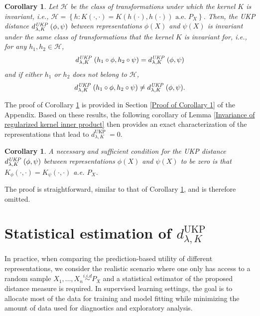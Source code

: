\documentclass[11pt]{article}
\newcommand{\repone}{\phi}
\newcommand{\reptwo}{\psi}
\newcommand{\metricstname}{UKP }
\theoremstyle{plain}
\newcounter{corollarynno}
\newtheorem{corollary}[corollarynno]{Corollary}
\begin{document}
\begin{corollary}
\label{corollary 1}
Let $\mathcal{H}$ be the class of transformations under which the kernel $K$ is invariant, i.e., $\mathcal{H} = \left\{h : K(\cdot,\cdot) = K(h(\cdot),h(\cdot))\textrm{ a.e. } P_{X}\right\}$. Then, the \emph{\metricstname} distance $d_{\lambda,K}^{\emph{\metricstname}}(\repone,\reptwo)$ between representations $\repone(X)$ and $\reptwo(X)$ is invariant under the same class of transformations that the kernel $K$ is invariant for, i.e., for any $h_{1},h_{2} \in \mathcal{H}$, 
\[
d_{\lambda,K}^{\emph{\metricstname}}(h_{1} \circ \repone,h_{2} \circ \reptwo) = d_{\lambda,K}^{\emph{\metricstname}}(\repone,\reptwo)
\]
and if either $h_{1}$ or $h_{2}$ does not belong to $\mathcal{H}$, \[
d_{\lambda,K}^{\emph{\metricstname}}(h_{1} \circ \repone,h_{2} \circ \reptwo) \neq d_{\lambda,K}^{\emph{\metricstname}}(\repone,\reptwo).
\]
\end{corollary}

The proof of Corollary \ref{corollary 1} is provided in Section  \ref{Proof of Corollary 1} of the Appendix. Based on these results, the following corollary of Lemma \ref{Invariance of regularized kernel inner product} then provides an exact characterization of the representations that lead to $d_{\lambda,K}^{\text{\metricstname}}=0$.

\begin{corollary}\label{corollary 2}
    A necessary and sufficient condition for the \emph{\metricstname} distance $d_{\lambda,K}^{\emph{\metricstname}}(\repone,\reptwo)$ between representations $\repone(X)$ and $\reptwo(X)$ to be zero is that $K_{\repone}(\cdot,\cdot) = K_{\reptwo}(\cdot,\cdot)$ a.e. $P_{X}$.
\end{corollary}

The proof is straightforward, similar to that of Corollary \ref{corollary 1}, and is therefore omitted.

\section{Statistical estimation of $d_{\lambda,K}^{\text{\metricstname}}$} \label{statistical estimation of UKP}

In practice, when comparing the prediction-based utility of different representations, we consider the realistic scenario where one only has access to a random sample $X_{1},\dots, X_{n} \overset{i.i.d}{\sim}P_{X}$ and a statistical estimator of the proposed distance measure is required. In supervised learning settings, the goal is to allocate most of the data for training and model fitting while minimizing the amount of data used for diagnostics and exploratory analysis.
\end{document}
